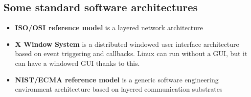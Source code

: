 \documentclass[12pt]{book}
\begin{document}
\subsection*{Some standard software architectures}

\begin{itemize}
    \item \textbf{ISO/OSI reference model} is a layered network architecture
    \item \textbf{X Window System} is a distributed windowed user interface architecture based on event triggering and callbacks. Linux can run without a GUI, but it can have a windowed GUI thanks to this.
    \item \textbf{NIST/ECMA reference model} is a generic software engineering environment architecture based on layered communication substrates
\end{itemize}
\end{document}

